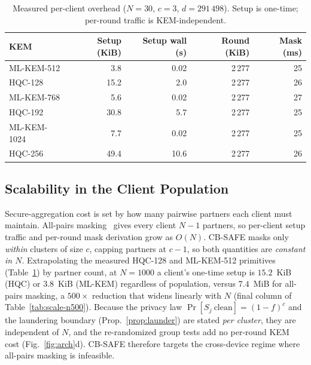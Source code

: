 \documentclass[lettersize,journal]{IEEEtran}
\begin{document}
\begin{table}[t]
\caption{Measured per-client overhead ($N{=}30$, $c{=}3$, $d{=}291\,498$).
Setup is one-time; per-round traffic is KEM-independent.}
\label{tab:overhead}
\centering
\footnotesize
\setlength{\tabcolsep}{3.5pt}
\begin{tabular}{@{}lrrrr@{}}
\toprule
KEM & Setup (KiB) & Setup wall (s) & Round (KiB) & Mask (ms) \\
\midrule
ML-KEM-512  & 3.8  & 0.02 & 2\,277 & 25 \\
HQC-128     & 15.2 & 2.0  & 2\,277 & 26 \\
ML-KEM-768  & 5.6  & 0.02 & 2\,277 & 27 \\
HQC-192     & 30.8 & 5.7  & 2\,277 & 25 \\
ML-KEM-1024 & 7.7  & 0.02 & 2\,277 & 25 \\
HQC-256     & 49.4 & 10.6 & 2\,277 & 26 \\
\bottomrule
\end{tabular}
\end{table}

\subsection{Scalability in the Client Population}
Secure-aggregation cost is set by how many pairwise partners each client must
maintain. All-pairs masking~\cite{bonawitz2017} gives every client $N-1$ partners,
so per-client setup traffic and per-round mask derivation grow as $O(N)$. CB-SAFE
masks only \emph{within} clusters of size $c$, capping partners at $c-1$, so both
quantities are \emph{constant in $N$}. Extrapolating the
measured HQC-128 and ML-KEM-512 primitives (Table~\ref{tab:overhead}) by partner
count, at $N{=}1000$ a client's one-time setup is $15.2$~KiB (HQC) or $3.8$~KiB
(ML-KEM) regardless of population, versus $7.4$~MiB for all-pairs masking, a
$500\times$ reduction that widens linearly with $N$ (final column of
Table~\ref{tab:scale-n500}). Because the privacy law
$\Pr[S_j\ \mathrm{clean}]{=}(1-f)^c$ and the laundering boundary
(Prop.~\ref{prop:launder}) are stated \emph{per cluster}, they are independent of
$N$, and the re-randomized group tests add no per-round KEM cost
(Fig.~\ref{fig:arch}d). CB-SAFE therefore targets the cross-device regime where
all-pairs masking is infeasible.
\end{document}
